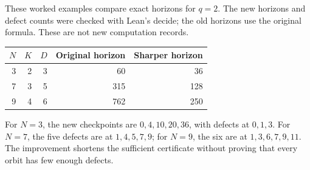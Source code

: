 \documentclass[11pt]{article}
\newcommand{\code}[1]{{\small\ttfamily #1}}
\begin{document}
These worked examples compare exact horizons for $q=2$. The new horizons
and defect counts were checked with Lean's \code{decide}; the old horizons
use the original formula. These are not new computation records.
\begin{center}
\begin{tabular}{rrrrr}
\toprule
$N$&$K$&$D$&Original horizon&Sharper horizon\\
\midrule
3&2&3&60&36\\
7&3&5&315&128\\
9&4&6&762&250\\
\bottomrule
\end{tabular}
\end{center}
For $N=3$, the new checkpoints are $0,4,10,20,36$, with defects at
$0,1,3$. For $N=7$, the five defects are at $1,4,5,7,9$; for $N=9$,
the six are at $1,3,6,7,9,11$. The improvement shortens the sufficient
certificate without proving that every orbit has few enough defects.
\end{document}
